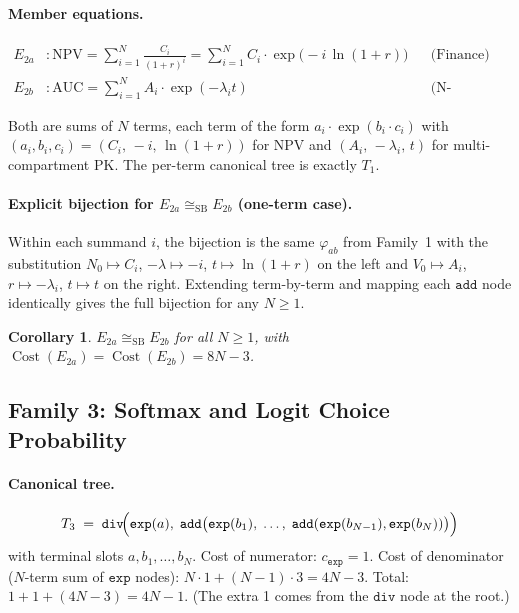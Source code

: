\documentclass[12pt,a4paper]{article}
\newtheorem{corollary}[theorem]{Corollary}
\theoremstyle{definition}
\newcommand{\Cost}{\operatorname{Cost}}
\newcommand{\mexp}{\mathtt{exp}}
\newcommand{\mdiv}{\mathtt{div}}
\newcommand{\madd}{\mathtt{add}}
\newcommand{\siso}{\cong_{\mathrm{SB}}}
\begin{document}
\paragraph{Member equations.}
\begin{align*}
  E_{2a} &: \mathrm{NPV}
    = \sum_{i=1}^{N} \frac{C_i}{(1+r)^i}
    = \sum_{i=1}^{N} C_i \cdot \exp\!\bigl(-i\,\ln(1+r)\bigr)
    && \text{(Finance)} \\
  E_{2b} &: \mathrm{AUC}
    = \sum_{i=1}^{N} A_i \cdot \exp(-\lambda_i t)
    && \text{(N-compartment PK)}
\end{align*}

Both are sums of $N$ terms, each term of the form $a_i \cdot \exp(b_i \cdot c_i)$
with $(a_i, b_i, c_i) = (C_i,\, -i,\, \ln(1+r))$ for NPV and
$(A_i,\, -\lambda_i,\, t)$ for multi-compartment PK.  The per-term canonical
tree is exactly $T_1$.

\paragraph{Explicit bijection for $E_{2a} \siso E_{2b}$ (one-term case).}

Within each summand $i$, the bijection is the same $\varphi_{ab}$ from
Family~1 with the substitution $N_0 \mapsto C_i$, $-\lambda \mapsto -i$,
$t \mapsto \ln(1+r)$ on the left and $V_0 \mapsto A_i$, $r \mapsto -\lambda_i$,
$t \mapsto t$ on the right.  Extending term-by-term and mapping each
$\madd$ node identically gives the full bijection for any $N \geq 1$.

\begin{corollary}
$E_{2a} \siso E_{2b}$ for all $N \geq 1$, with $\Cost(E_{2a}) =
\Cost(E_{2b}) = 8N - 3$.
\end{corollary}

\subsection{Family 3: Softmax and Logit Choice Probability}
\label{sec:fam3}

\paragraph{Canonical tree.}
\[
  T_3 \;=\; \mdiv\!\Bigl(
    \mexp(a),\;
    \madd\bigl(\mexp(b_1),\;\ldots,\;\madd(\mexp(b_{N-1}),\mexp(b_N))\bigr)
  \Bigr)
\]
with terminal slots $a, b_1, \ldots, b_N$.
Cost of numerator: $c_{\mexp} = 1$.
Cost of denominator ($N$-term sum of $\mexp$ nodes):
$N \cdot 1 + (N-1) \cdot 3 = 4N - 3$.
Total: $1 + 1 + (4N - 3) = 4N - 1$.
(The extra 1 comes from the $\mdiv$ node at the root.)
\end{document}
